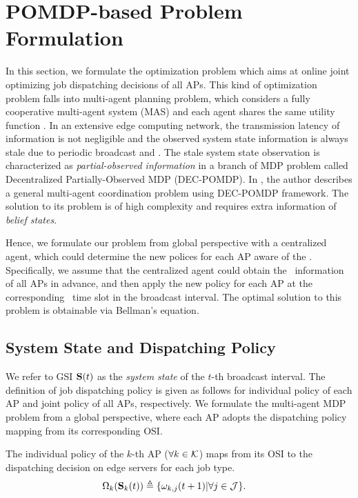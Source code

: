 \section{POMDP-based Problem Formulation}
In this section, we formulate the optimization problem which aims at online joint optimizing job dispatching decisions of all APs.
This kind of optimization problem falls into multi-agent planning problem, which considers a fully cooperative multi-agent system (MAS) and each agent shares the same utility function .
In an extensive edge computing network, the transmission latency of information is not negligible and the observed system state information is always stale due to periodic broadcast and \brlatency.
The stale system state observation is characterized as \emph{partial-observed information} in a branch of MDP problem called Decentralized Partially-Observed MDP (DEC-POMDP).
In , the author describes a general multi-agent coordination problem using DEC-POMDP framework. The solution to its problem is of high complexity and requires extra information of \emph{belief states}.

Hence, we formulate our problem from global perspective with a centralized agent, which could determine the new polices for each AP aware of the \brlatency.
Specifically, we assume that the centralized agent could obtain the \brlatency~information of all APs in advance, and then apply the new policy for each AP at the corresponding \brlatency~time slot in the broadcast interval.
The optimal solution to this problem is obtainable via Bellman's equation.


\subsection{System State and Dispatching Policy}
We refer to GSI $\mathbf{S}(t)$ as the \emph{system state} of the $t$-th broadcast interval.
The definition of job dispatching policy is given as follows for individual policy of each AP and joint policy of all APs, respectively.
We formulate the multi-agent MDP problem from a global perspective, where each AP adopts the dispatching policy mapping from its corresponding OSI.
\begin{definition}
    The individual policy of the $k$-th AP ($\forall k \in\mathcal{K}$) maps from its OSI to the dispatching decision on edge servers for each job type.
    \begin{align}
        &\Omega_{k}(\mathbf{S}_{k}(t)) \triangleq \{\omega_{k,j}(t+1)|\forall j\in\mathcal{J}\}.
        \label{def_action}
    \end{align}
\end{definition}

